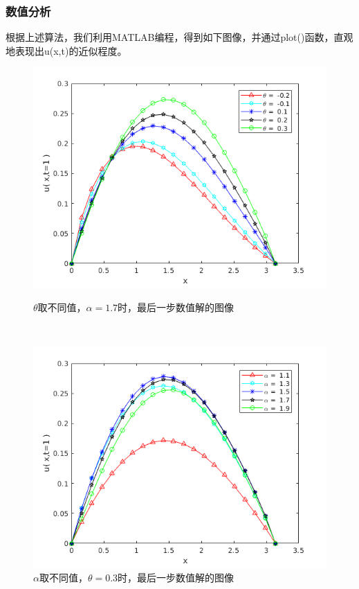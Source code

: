 \documentclass[notheorems,serif]{beamer}
\begin{document}
\begin{frame}
\frametitle{数值分析}

\qquad 根据上述算法，我们利用MATLAB编程，得到如下图像，并通过plot()函数，直观地表现出u(x,t)的近似程度。
\begin{figure}[h]
	\begin{minipage}[t]{0.4\linewidth}%
		\centering     %
		\includegraphics[width=1.2\textwidth]{theta.png}
		\caption{$\theta$取不同值，$\alpha=1.7$时，最后一步数值解的图像}%
		\label{fig:liuchengtu1}%
	\end{minipage} 
	\hfill
	\begin{minipage}[t]{0.4\linewidth}
		\centering
		\includegraphics[width=1.2\textwidth]{alpha.png}
		\caption{$\alpha$取不同值，$\theta=0.3$时，最后一步数值解的图像}%
		\label{fig:liuchengtu2}
	\end{minipage}
\end{figure}
\end{frame}
\end{document}
